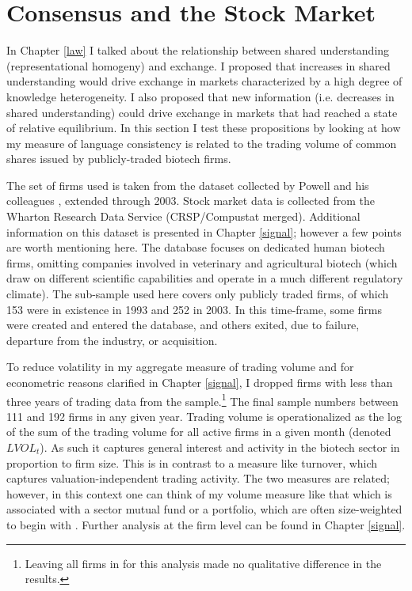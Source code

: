 \section{Consensus and the Stock Market}

In Chapter \ref{law} I talked about the relationship between shared understanding (representational homogeny) and exchange.  I proposed that increases in shared understanding would drive exchange in markets characterized by a high degree of knowledge heterogeneity. I also proposed that new information (i.e. decreases in shared understanding) could drive exchange in markets that had reached a state of relative equilibrium. In this section I test these propositions by looking at how my measure of language consistency is related to the trading volume of common shares issued by publicly-traded biotech firms.

The set of firms used is taken from the dataset collected by Powell and his colleagues \citep[see][]{powell2005, powell1996}, extended through 2003. Stock market data is collected from the Wharton Research Data Service (CRSP/Compustat merged). Additional information on this dataset is presented in Chapter \ref{signal}; however a few points are worth mentioning here. The database focuses on dedicated human biotech firms, omitting companies involved in veterinary and agricultural biotech (which draw on different scientific capabilities and operate in a much different regulatory climate). The sub-sample used here covers only publicly traded firms, of which 153 were in existence in 1993 and 252 in 2003. In this time-frame, some firms were created and entered the database, and others exited, due to failure, departure from the industry, or acquisition. 

To reduce volatility in my aggregate measure of trading volume and for econometric reasons clarified in Chapter \ref{signal}, I dropped firms with less than three years of trading data from the sample.\footnote{Leaving all firms in for this analysis made no qualitative difference in the results.} The final sample numbers between 111 and 192 firms in any given year. Trading volume is operationalized as the log of the sum of the trading volume for all active firms in a given month (denoted $LVOL_t$). As such it captures general interest and activity in the biotech sector in proportion to firm size. This is in contrast to a measure like turnover, which captures valuation-independent trading activity. The two measures are related; however, in this context one can think of my volume measure like that which is associated with a sector mutual fund or a portfolio, which are often size-weighted to begin with \citep{kim1991}. Further analysis at the firm level can be found in Chapter \ref{signal}.

